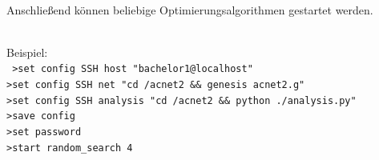 \documentclass[
  a4paper,               %
  twoside,               %
  DIV=12,                %
  BCOR=8mm,              %
  headinclude=true,      %
  footinclude=false,     %
  numbers=noenddot,      %
  headheight=40pt,       %
  11pt]{scrartcl}        %
\begin{document}
\newline\\
Anschließend können beliebige Optimierungsalgorithmen gestartet werden.\\
\newline\\
\begin{samepage}
Beispiel:\\
\texttt{
\noindent\hspace*{10mm}	>set config SSH host "bachelor1@localhost"\\
\noindent\hspace*{10mm}	>set config SSH net "cd  \raisebox{-0.6ex}{\~{ }}/acnet2 \&\& genesis acnet2.g"\\
\noindent\hspace*{10mm}	>set config SSH analysis "cd  \raisebox{-0.6ex}{\~{ }}/acnet2 \&\& python ./analysis.py"\\
\noindent\hspace*{10mm}	>save config\\
\noindent\hspace*{10mm}	>set password\\
\noindent\hspace*{10mm}	>start random\_search 4
	}\\
\end{samepage}
\end{document}
